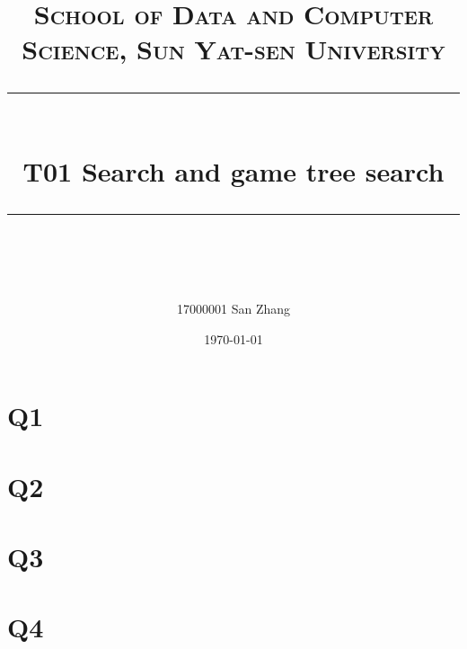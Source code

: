 ﻿\documentclass[a4paper, 11pt]{article}
\title{	
\normalfont \normalsize
\textsc{School of Data and Computer Science, Sun Yat-sen University} \\ [25pt] %
\rule{\textwidth}{0.5pt} \\[0.4cm] %
\huge  T01 Search and game tree search\\ %
\rule{\textwidth}{2pt} \\[0.5cm] %
\author{17000001 San Zhang}
\date{\normalsize\today}
}
\begin{document}
\maketitle
\tableofcontents
\newpage
\section{Q1}
\section{Q2}
\section{Q3}
\section{Q4}


%
%
\end{document}
